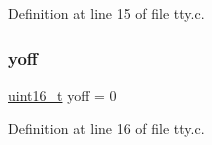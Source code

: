 Definition at line 15 of file tty.\+c.

\mbox{\label{a00041_a1a7539764d0ae8cd06ce45c62cf92bca_a1a7539764d0ae8cd06ce45c62cf92bca}} 
\subsubsection{\texorpdfstring{yoff}{yoff}}
{\footnotesize\ttfamily \hyperlink{a00035_a273cf69d639a59973b6019625df33e30_a273cf69d639a59973b6019625df33e30}{uint16\+\_\+t} yoff = 0}



Definition at line 16 of file tty.\+c.

